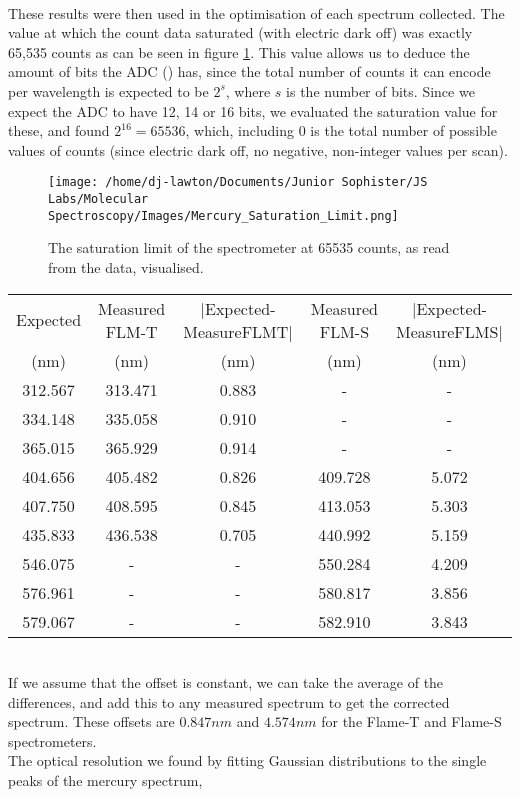\documentclass{article}
\begin{document}
\vspace{1cm}\\
These results were then used in the optimisation of each spectrum collected.
\indent The value at which the count data saturated (with electric dark off) was exactly 65,535 counts as can be seen in figure \ref{fig:MercurySaturation}. This value allows us to deduce the amount of bits the ADC () has, since the total number of counts it can encode per wavelength is expected to be $2^s$, where $s$ is the number of bits. Since we expect the ADC to have 12, 14 or 16 bits, we evaluated the saturation value for these, and found $2^{16}=65536$, which, including $0$ is the total number of possible values of counts (since electric dark off, no negative, non-integer values per scan).
\begin{figure}[H]
    \centering
    \texttt{[image: /home/dj-lawton/Documents/Junior Sophister/JS Labs/Molecular Spectroscopy/Images/Mercury\_Saturation\_Limit.png]}
    \caption{\label{fig:MercurySaturation} The saturation limit of the spectrometer at 65535 counts, as read from the data, visualised.}
\end{figure}
\begin{tabular}{c|c|c|c|c}
    \hline
    \hline
    Expected\cite{article2} & Measured FLM-T & |Expected-MeasureFLMT| & Measured FLM-S & |Expected-MeasureFLMS|\\
    (nm)& (nm)& (nm)& (nm)& (nm)\\
    \hline
    312.567 & 313.471 & 0.883 & - & -\\
    334.148 & 335.058 & 0.910 & - & -\\
    365.015 & 365.929 & 0.914 & - & -\\
    404.656 & 405.482 & 0.826 & 409.728 & 5.072 \\
    407.750 & 408.595 & 0.845 & 413.053 & 5.303 \\
    435.833 & 436.538 & 0.705 & 440.992 & 5.159 \\
    546.075 & - & - & 550.284 & 4.209 \\
    576.961 & - & - & 580.817 & 3.856 \\
    579.067 & - & - & 582.910 & 3.843 \\
    \hline
    \hline
\end{tabular}
\vspace{1cm}\\
If we assume that the offset is constant, we can take the average of the differences, and add this to any measured spectrum to get the corrected spectrum. These offsets are $0.847nm$ and $4.574nm$ for the Flame-T and Flame-S spectrometers.\\
\indent The optical resolution we found by fitting Gaussian distributions to the single peaks of the mercury spectrum,
\end{document}
